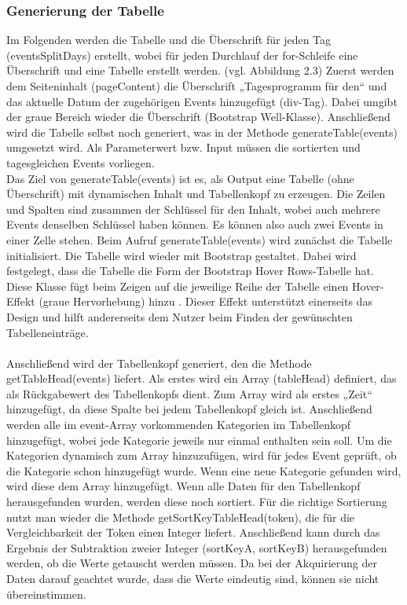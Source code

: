 \subsubsection{Generierung der Tabelle}
Im Folgenden werden die Tabelle und die Überschrift für jeden Tag (eventsSplitDays) erstellt, wobei für jeden Durchlauf der for-Schleife eine Überschrift und eine Tabelle erstellt werden. (vgl. Abbildung 2.3) Zuerst werden dem Seiteninhalt (pageContent) die Überschrift „Tagesprogramm für den“ und das aktuelle Datum der zugehörigen Events hinzugefügt (div-Tag). Dabei umgibt der graue Bereich wieder die Überschrift (Bootstrap Well-Klasse). 
Anschließend wird die Tabelle selbst noch generiert, was in der Methode generateTable(events) umgesetzt wird. Als Parameterwert bzw. Input müssen die sortierten und tagesgleichen Events vorliegen. \\
Das Ziel von generateTable(events) ist es, als Output eine Tabelle (ohne Überschrift) mit dynamischen Inhalt und Tabellenkopf zu erzeugen. Die Zeilen und Spalten sind zusammen der Schlüssel für den Inhalt, wobei auch mehrere Events denselben Schlüssel haben können. Es können also auch zwei Events in einer Zelle stehen. 
Beim Aufruf generateTable(events) wird zunächst die Tabelle initialisiert. Die Tabelle wird wieder mit Bootstrap gestaltet. Dabei wird festgelegt, dass die Tabelle die Form der Bootstrap Hover Rows-Tabelle hat. Diese Klasse fügt beim Zeigen auf die jeweilige Reihe der Tabelle einen Hover-Effekt (graue Hervorhebung) hinzu \cite{table}.  Dieser Effekt unterstützt einerseits das Design und hilft andererseits dem Nutzer beim Finden der gewünschten Tabelleneinträge. \\
\\
Anschließend wird der Tabellenkopf generiert, den die Methode getTableHead(events) liefert. Als erstes wird ein Array (tableHead) definiert, das als Rückgabewert des Tabellenkopfs dient. Zum Array wird als erstes „Zeit“ hinzugefügt, da diese Spalte bei jedem Tabellenkopf gleich ist. Anschließend werden alle im event-Array vorkommenden Kategorien im Tabellenkopf hinzugefügt, wobei jede Kategorie jeweils nur einmal enthalten sein soll. Um die Kategorien dynamisch zum Array hinzuzufügen, wird für jedes Event geprüft, ob die Kategorie schon hinzugefügt wurde. Wenn eine neue Kategorie gefunden wird, wird diese dem Array hinzugefügt. Wenn alle Daten für den Tabellenkopf herausgefunden wurden, werden diese noch sortiert. Für die richtige Sortierung nutzt man wieder die Methode getSortKeyTableHead(token), die für die Vergleichbarkeit der Token einen Integer liefert. Anschließend kann durch das Ergebnis der Subtraktion zweier Integer (sortKeyA, sortKeyB) herausgefunden werden, ob die Werte getauscht werden müssen. Da bei der Akquirierung der Daten darauf geachtet wurde, dass die Werte eindeutig sind, können sie nicht übereinstimmen.

